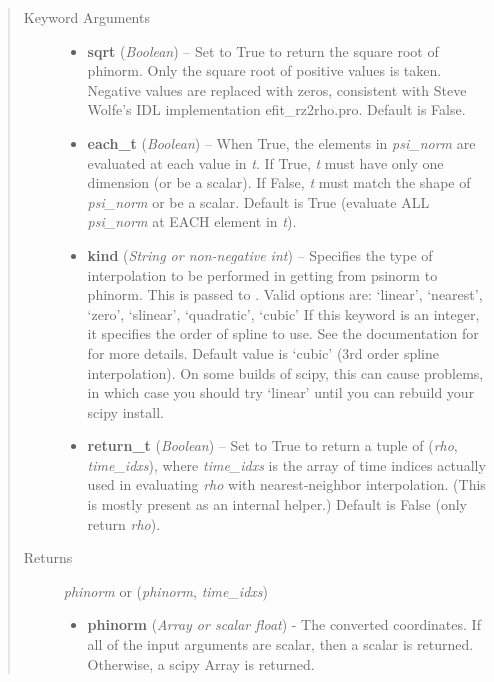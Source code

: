 \documentclass[letterpaper,10pt,english]{sphinxmanual}
\begin{document}
\begin{fulllineitems}
\begin{fulllineitems}
\begin{quote}
\begin{description}
\begin{itemize}
\end{itemize}

\item[{Keyword Arguments}] \leavevmode\begin{itemize}
\item {} 
\textbf{sqrt} (\emph{Boolean}) --
Set to True to return the square root of phinorm. Only
the square root of positive values is taken. Negative values are
replaced with zeros, consistent with Steve Wolfe's IDL
implementation efit\_rz2rho.pro. Default is False.

\item {} 
\textbf{each\_t} (\emph{Boolean}) --
When True, the elements in \emph{psi\_norm} are evaluated at
each value in \emph{t}. If True, \emph{t} must have only one dimension (or
be a scalar). If False, \emph{t} must match the shape of \emph{psi\_norm} or be
a scalar. Default is True (evaluate ALL \emph{psi\_norm} at EACH element in
\emph{t}).

\item {} 
\textbf{kind} (\emph{String or non-negative int}) --
Specifies the type of
interpolation to be performed in getting from psinorm to
phinorm. This is passed to
. Valid options are:
`linear', `nearest', `zero', `slinear', `quadratic', `cubic'
If this keyword is an integer, it specifies the order of spline
to use. See the documentation for  for more
details. Default value is `cubic' (3rd order spline
interpolation). On some builds of scipy, this can cause problems,
in which case you should try `linear' until you can rebuild your
scipy install.

\item {} 
\textbf{return\_t} (\emph{Boolean}) --
Set to True to return a tuple of (\emph{rho},
\emph{time\_idxs}), where \emph{time\_idxs} is the array of time indices
actually used in evaluating \emph{rho} with nearest-neighbor
interpolation. (This is mostly present as an internal helper.)
Default is False (only return \emph{rho}).

\end{itemize}

\item[{Returns}] \leavevmode

\emph{phinorm} or (\emph{phinorm}, \emph{time\_idxs})
\begin{itemize}
\item {} 
\textbf{phinorm} (\emph{Array or scalar float}) - The converted coordinates. If
all of the input arguments are scalar, then a scalar is returned.
Otherwise, a scipy Array is returned.


\end{itemize}
\end{description}
\end{quote}
\end{fulllineitems}
\end{fulllineitems}
\end{document}
